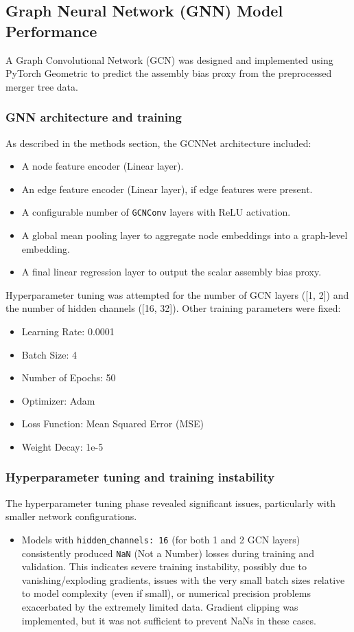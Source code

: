 \documentclass[twocolumn]{aastex631}
\begin{document}
\subsection{Graph Neural Network (GNN) Model Performance}

A Graph Convolutional Network (GCN) was designed and implemented using PyTorch Geometric to predict the assembly bias proxy from the preprocessed merger tree data.

\subsubsection{GNN architecture and training}
As described in the methods section, the GCNNet architecture included:
\begin{itemize}
    \item A node feature encoder (Linear layer).
    \item An edge feature encoder (Linear layer), if edge features were present.
    \item A configurable number of \texttt{GCNConv} layers with ReLU activation.
    \item A global mean pooling layer to aggregate node embeddings into a graph-level embedding.
    \item A final linear regression layer to output the scalar assembly bias proxy.
\end{itemize}

Hyperparameter tuning was attempted for the number of GCN layers ([1, 2]) and the number of hidden channels ([16, 32]). Other training parameters were fixed:
\begin{itemize}
    \item Learning Rate: 0.0001
    \item Batch Size: 4
    \item Number of Epochs: 50
    \item Optimizer: Adam
    \item Loss Function: Mean Squared Error (MSE)
    \item Weight Decay: 1e-5
\end{itemize}

\subsubsection{Hyperparameter tuning and training instability}
The hyperparameter tuning phase revealed significant issues, particularly with smaller network configurations.
\begin{itemize}
    \item Models with \texttt{hidden\ensuremath{\_}channels: 16} (for both 1 and 2 GCN layers) consistently produced \texttt{NaN} (Not a Number) losses during training and validation. This indicates severe training instability, possibly due to vanishing/exploding gradients, issues with the very small batch sizes relative to model complexity (even if small), or numerical precision problems exacerbated by the extremely limited data. Gradient clipping was implemented, but it was not sufficient to prevent NaNs in these cases.
\end{itemize}
\end{document}
